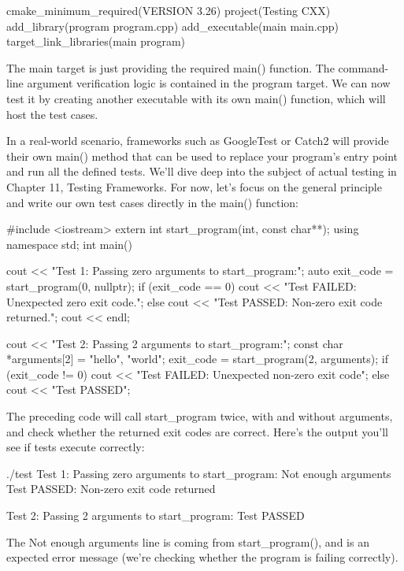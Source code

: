 \begin{cmake}
cmake_minimum_required(VERSION 3.26)
project(Testing CXX)
add_library(program program.cpp)
add_executable(main main.cpp)
target_link_libraries(main program)
\end{cmake}

The main target is just providing the required main() function. The command-line argument verification logic is contained in the program target. We can now test it by creating another executable with its own main() function, which will host the test cases.

In a real-world scenario, frameworks such as GoogleTest or Catch2 will provide their own main() method that can be used to replace your program’s entry point and run all the defined tests. We’ll dive deep into the subject of actual testing in Chapter 11, Testing Frameworks. For now, let’s focus on the general principle and write our own test cases directly in the main() function:


\begin{cpp}
#include <iostream>
extern int start_program(int, const char**);
using namespace std;
int main()
{
    cout << "Test 1: Passing zero arguments to start_program:\n";
    auto exit_code = start_program(0, nullptr);
    if (exit_code == 0)
        cout << "Test FAILED: Unexpected zero exit code.\n";
    else
        cout << "Test PASSED: Non-zero exit code returned.\n";
    cout << endl;

    cout << "Test 2: Passing 2 arguments to start_program:\n";
    const char *arguments[2] = {"hello", "world"};
    exit_code = start_program(2, arguments);
    if (exit_code != 0)
        cout << "Test FAILED: Unexpected non-zero exit code\n";
    else
        cout << "Test PASSED\n";
}
\end{cpp}

The preceding code will call start\_program twice, with and without arguments, and check whether the returned exit codes are correct. Here’s the output you’ll see if tests execute correctly:

\begin{shell}
./test
Test 1: Passing zero arguments to start_program:
Not enough arguments
Test PASSED: Non-zero exit code returned

Test 2: Passing 2 arguments to start_program:
Test PASSED
\end{shell}

The Not enough arguments line is coming from start\_program(), and is an expected error message (we’re checking whether the program is failing correctly).

